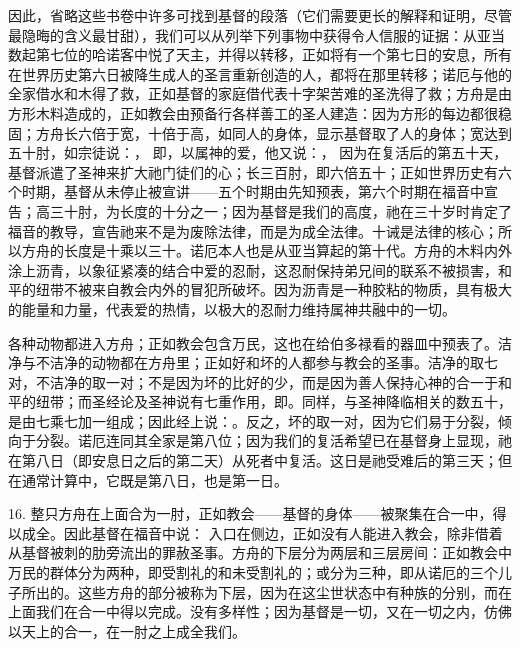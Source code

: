 因此，省略这些书卷中许多可找到基督的段落（它们需要更长的解释和证明，尽管最隐晦的含义最甘甜），我们可以从列举下列事物中获得令人信服的证据：从亚当数起第七位的哈诺客中悦了天主，并得以转移，正如将有一个第七日的安息，所有在世界历史第六日被降生成人的圣言重新创造的人，都将在那里转移；诺厄与他的全家借水和木得了救，正如基督的家庭借代表十字架苦难的圣洗得了救；方舟是由方形木料造成的，正如教会由预备行各样善工的圣人建造：因为方形的每边都很稳固；方舟长六倍于宽，十倍于高，如同人的身体，显示基督取了人的身体；宽达到五十肘，如宗徒说：， 即，以属神的爱，他又说：， 因为在复活后的第五十天，基督派遣了圣神来扩大祂门徒们的心；长三百肘，即六倍五十；正如世界历史有六个时期，基督从未停止被宣讲——五个时期由先知预表，第六个时期在福音中宣告；高三十肘，为长度的十分之一；因为基督是我们的高度，祂在三十岁时肯定了福音的教导，宣告祂来不是为废除法律，而是为成全法律。十诫是法律的核心；所以方舟的长度是十乘以三十。诺厄本人也是从亚当算起的第十代。方舟的木料内外涂上沥青，以象征紧凑的结合中爱的忍耐，这忍耐保持弟兄间的联系不被损害，和平的纽带不被来自教会内外的冒犯所破坏。因为沥青是一种胶粘的物质，具有极大的能量和力量，代表爱的热情，以极大的忍耐力维持属神共融中的一切。\par

各种动物都进入方舟；正如教会包含万民，这也在给伯多禄看的器皿中预表了。洁净与不洁净的动物都在方舟里；正如好和坏的人都参与教会的圣事。洁净的取七对，不洁净的取一对；不是因为坏的比好的少，而是因为善人保持心神的合一于和平的纽带；而圣经论及圣神说有七重作用，即。同样，与圣神降临相关的数五十，是由七乘七加一组成；因此经上说：。反之，坏的取一对，因为它们易于分裂，倾向于分裂。诺厄连同其全家是第八位；因为我们的复活希望已在基督身上显现，祂在第八日（即安息日之后的第二天）从死者中复活。这日是祂受难后的第三天；但在通常计算中，它既是第八日，也是第一日。\par

16. 整只方舟在上面合为一肘，正如教会——基督的身体——被聚集在合一中，得以成全。因此基督在福音中说： 入口在侧边，正如没有人能进入教会，除非借着从基督被刺的肋旁流出的罪赦圣事。方舟的下层分为两层和三层房间：正如教会中万民的群体分为两种，即受割礼的和未受割礼的；或分为三种，即从诺厄的三个儿子所出的。这些方舟的部分被称为下层，因为在这尘世状态中有种族的分别，而在上面我们在合一中得以完成。没有多样性；因为基督是一切，又在一切之内，仿佛以天上的合一，在一肘之上成全我们。\par

